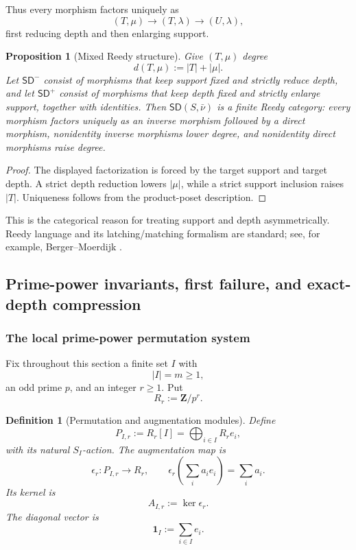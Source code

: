 \documentclass[11pt]{article}
\newtheorem{proposition}[theorem]{Proposition}
\newtheorem{definition}[theorem]{Definition}
\theoremstyle{remark}
\newcommand{\Z}{\mathbf Z}
\providecommand{\SD}{\mathsf{SD}}
\begin{document}
Thus every morphism factors uniquely as
\[
 (T,\mu)\longrightarrow(T,\lambda)
 \longrightarrow(U,\lambda),
\]
first reducing depth and then enlarging support.

\begin{proposition}[Mixed Reedy structure]\label{P1C-prop:mixed-reedy}
Give \((T,\mu)\) degree
\[
 d(T,\mu):=|T|+|\mu|.
\]
Let \(\SD^-\) consist of morphisms that keep support fixed and strictly reduce depth, and let \(\SD^+\) consist of morphisms that keep depth fixed and strictly enlarge support, together with identities.  Then \(\SD(S,\bar\nu)\) is a finite Reedy category: every morphism factors uniquely as an inverse morphism followed by a direct morphism, nonidentity inverse morphisms lower degree, and nonidentity direct morphisms raise degree.
\end{proposition}

\begin{proof}
The displayed factorization is forced by the target support and target depth.  A strict depth reduction lowers \(|\mu|\), while a strict support inclusion raises \(|T|\).  Uniqueness follows from the product-poset description.
\end{proof}

This is the categorical reason for treating support and depth asymmetrically.  Reedy language and its latching/matching formalism are standard; see, for example, Berger--Moerdijk \cite{BergerMoerdijkReedy}.

\subsection{Prime-power invariants, first failure, and exact-depth compression}

\subsubsection{The local prime-power permutation system}

Fix throughout this section a finite set \(I\) with
\[
 |I|=m\ge1,
\]
an odd prime \(p\), and an integer \(r\ge1\).  Put
\[
 R_r:=\Z/p^r.
\]

\begin{definition}[Permutation and augmentation modules]
Define
\[
 P_{I,r}:=R_r[I]=\bigoplus_{i\in I}R_r e_i,
\]
with its natural \(S_I\)-action.  The augmentation map is
\[
 \epsilon_r:P_{I,r}\longrightarrow R_r,
 \qquad
 \epsilon_r\!\left(\sum_i a_i e_i\right)=\sum_i a_i.
\]
Its kernel is
\[
 A_{I,r}:=\ker\epsilon_r.
\]
The diagonal vector is
\[
 \mathbf1_I:=\sum_{i\in I}e_i.
\]
\end{definition}
\end{document}
